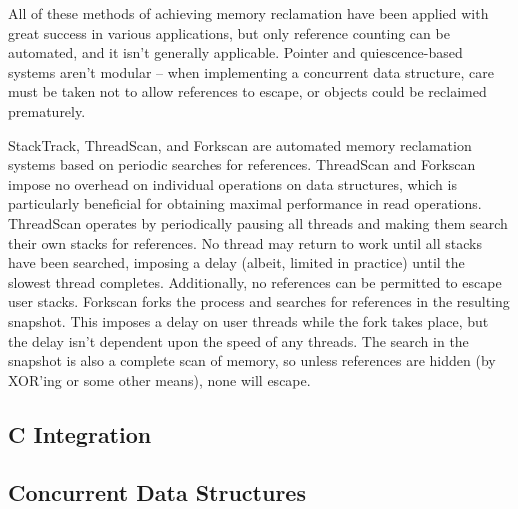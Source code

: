 All of these methods of achieving memory reclamation have been applied with great success in various applications, but only reference counting can be automated, and it isn't generally applicable.  Pointer and quiescence-based systems aren't modular -- when implementing a concurrent data structure, care must be taken not to allow references to escape, or objects could be reclaimed prematurely.

StackTrack\cite{StackTrack}, ThreadScan\cite{Threadscan}, and Forkscan\cite{Forkscan} are automated memory reclamation systems based on periodic searches for references.  ThreadScan and Forkscan impose no overhead on individual operations on data structures, which is particularly beneficial for obtaining maximal performance in read operations.  ThreadScan operates by periodically pausing all threads and making them search their own stacks for references.  No thread may return to work until all stacks have been searched, imposing a delay (albeit, limited in practice) until the slowest thread completes.  Additionally, no references can be permitted to escape user stacks.  Forkscan forks the process and searches for references in the resulting snapshot.  This imposes a delay on user threads while the fork takes place, but the delay isn't dependent upon the speed of any threads.  The search in the snapshot is also a complete scan of memory, so unless references are hidden (by XOR'ing or some other means), none will escape.

\subsection{C Integration}

\subsection{Concurrent Data Structures}
